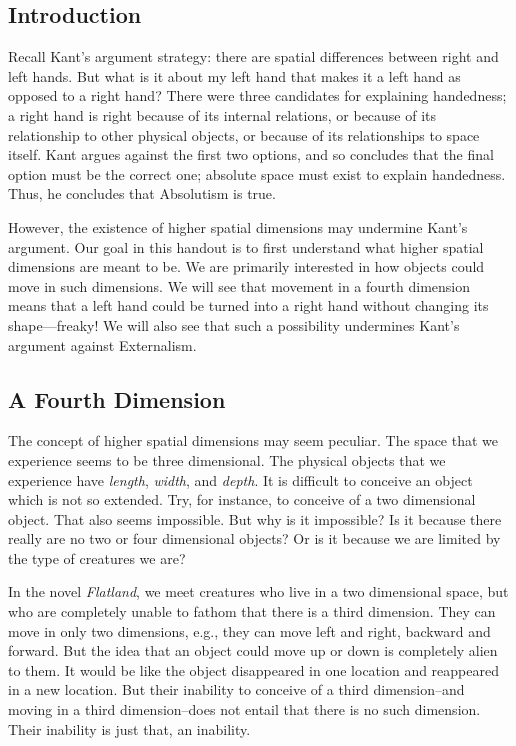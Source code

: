 \documentclass[oneside]{article}
\begin{document}
\thispagestyle{fancy}



\subsection*{Introduction}

Recall Kant's argument strategy: there are spatial differences between right and
left hands. But what is it about my left hand that makes it a
left hand as opposed to a right hand? There were three candidates for explaining handedness; a right hand is right because of its internal relations, or because of its relationship to other physical objects, or because of its relationships to space itself. Kant argues against the first two options, and so concludes that the final option must be the correct one; absolute space must exist to explain handedness. Thus, he concludes that Absolutism is true. 

However, the existence of higher spatial dimensions may undermine Kant's argument. Our goal in this handout is to first understand what higher spatial dimensions are meant to be. We are primarily interested in how objects could move in such dimensions. We will see that movement in a fourth dimension means that a left hand could be turned into a right hand without changing its shape---freaky! We will also see that such a possibility undermines Kant's argument against Externalism.

\subsection*{A Fourth Dimension}

The concept of higher spatial dimensions may seem peculiar. The space that we experience seems to be three dimensional. The physical objects that we experience have \emph{length}, \emph{width}, and \emph{depth}. It is difficult to conceive an object which is not so extended. Try, for instance, to conceive of a two dimensional object. That also seems impossible. But why is it impossible? Is it because there really are no two or four dimensional objects? Or is it because we are limited by the type of creatures we are? 

In the novel \emph{Flatland}, we meet creatures who live in a two dimensional space, but who are completely unable to fathom that there is a third dimension. They can move in only two dimensions, e.g., they can move left and right, backward and forward. But the idea that an object could move up or down is completely alien to them. It would be like the object disappeared in one location and reappeared in a new location. But their inability to conceive of a third dimension--and moving in a third dimension--does not entail that there is no such dimension. Their inability is just that, an inability. 
\end{document}
